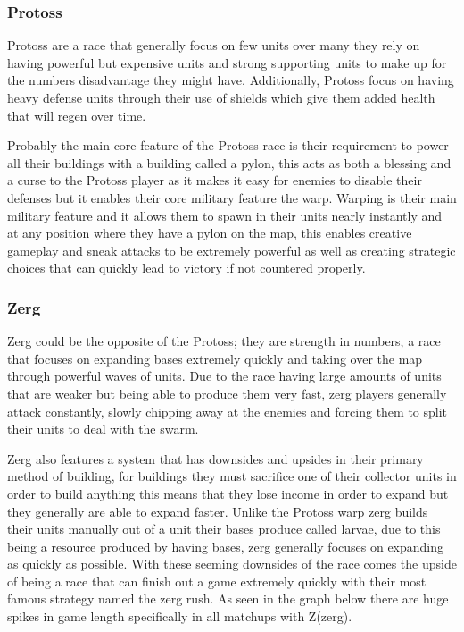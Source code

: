 \documentclass[a4paper,12pt]{report}
\begin{document}
\subsubsection{Protoss}

Protoss are a race that generally focus on few units over many they rely on having powerful but expensive units and strong supporting units to make up for the numbers disadvantage they might have. Additionally, Protoss focus on having heavy defense units through their use of shields which give them added health that will regen over time.

Probably the main core feature of the Protoss race is their requirement to power all their buildings with a building called a pylon, this acts as both a blessing and a curse to the Protoss player as it makes it easy for enemies to disable their defenses but it enables their core military feature the warp. Warping is their main military feature and it allows them to spawn in their units nearly instantly and at any position where they have a pylon on the map, this enables creative gameplay and sneak attacks to be extremely powerful as well as creating strategic choices that can quickly lead to victory if not countered properly.

\subsubsection{Zerg}

Zerg could be the opposite of the Protoss; they are strength in numbers, a race that focuses on expanding bases extremely quickly and taking over the map through powerful waves of units. Due to the race having large amounts of units that are weaker but being able to produce them very fast, zerg players generally attack constantly, slowly chipping away at the enemies and forcing them to split their units to deal with the swarm.

Zerg also features a system that has downsides and upsides in their primary method of building, for buildings they must sacrifice one of their collector units in order to build anything this means that they lose income in order to expand but they generally are able to expand faster. Unlike the Protoss warp  zerg builds their units manually out of a unit their bases produce called larvae, due to this being a resource produced by having bases, zerg generally focuses on expanding as quickly as possible. With these seeming downsides of the race comes the upside of being a race that can finish out a game extremely quickly with their most famous strategy named the zerg rush. As seen in the graph below there are huge spikes in game length specifically in all matchups with Z(zerg).
\end{document}
